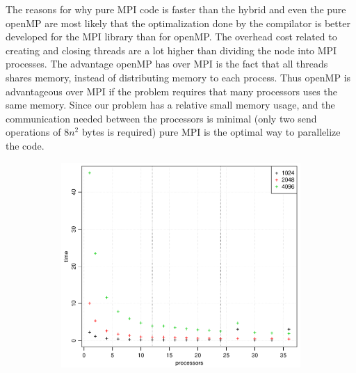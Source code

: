 The reasons for why pure MPI code is faster than the hybrid and even the pure openMP are most likely that the optimalization done by the compilator is better developed for the MPI library than for openMP. The overhead cost related to creating and closing threads are a lot higher than dividing the node into MPI processes. The advantage openMP has over MPI is the fact that all threads shares memory, instead of distributing memory to each process. Thus openMP is advantageous over MPI if the problem requires that many processors uses the same memory. Since our problem has a relative small memory usage, and the communication needed between the processors is minimal (only two send operations of $8n^2$ bytes is required) pure MPI is the optimal way to parallelize the code.  
\\
\begin{figure}[h!]
  \centering
  \begin{subfigure}[b]{0.40\textwidth}
    \includegraphics[width=\textwidth]{./Figures/taskbTimeProc1.pdf}
    \caption{}
    \label{fig:time1}
  \end{subfigure}%
  \quad
  \begin{subfigure}[b]{0.40\textwidth}

\end{subfigure}
\end{figure}
